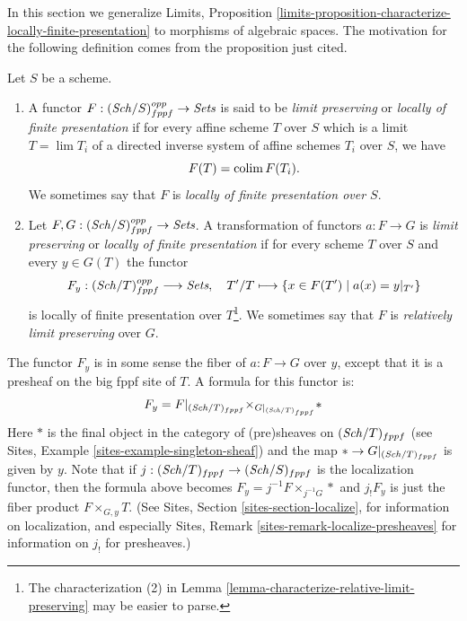 \noindent
In this section we generalize
Limits, Proposition
\ref{limits-proposition-characterize-locally-finite-presentation}
to morphisms of algebraic spaces.
The motivation for the following definition comes from
the proposition just cited.

\begin{definition}
\label{definition-locally-finite-presentation}
Let $S$ be a scheme.
\begin{enumerate}
\item A functor $F : (\mathit{Sch}/S)_{fppf}^{opp} \to \textit{Sets}$
is said to be {\it limit preserving} or {\it locally of finite presentation} if
for every affine scheme $T$ over $S$ which is a limit $T = \lim T_i$
of a directed inverse system of affine schemes $T_i$ over $S$, we have
$$
F(T) = \mathop{\mathrm{colim}}\nolimits F(T_i).
$$
We sometimes say that $F$ is {\it locally of finite presentation over $S$}.
\item Let $F, G : (\mathit{Sch}/S)_{fppf}^{opp} \to \textit{Sets}$.
A transformation of functors $a : F \to G$
is {\it limit preserving} or {\it locally of finite presentation}
if for every scheme $T$ over $S$ and every $y \in G(T)$ the functor
$$
F_y : (\mathit{Sch}/T)_{fppf}^{opp} \longrightarrow \textit{Sets}, \quad
T'/T \longmapsto \{x \in F(T') \mid a(x) = y|_{T'}\}
$$
is locally of finite presentation over $T$\footnote{The characterization (2) in
Lemma \ref{lemma-characterize-relative-limit-preserving}
may be easier to parse.}. We sometimes say that
$F$ is {\it relatively limit preserving} over $G$.
\end{enumerate}
\end{definition}

\noindent
The functor $F_y$ is in some sense the fiber of
$a : F \to G$ over $y$, except that it is a presheaf on the big fppf
site of $T$. A formula for this functor is:
\begin{equation}
\label{equation-fibre-map-functors}
F_y =
F|_{(\mathit{Sch}/T)_{fppf}}
{\times}_{G|_{(\mathit{Sch}/T)_{fppf}}}
*
\end{equation}
Here $*$ is the final object in the category of (pre)sheaves
on $(\mathit{Sch}/T)_{fppf}$ (see
Sites, Example \ref{sites-example-singleton-sheaf})
and the map $* \to G|_{(\mathit{Sch}/T)_{fppf}}$ is given by $y$.
Note that if $j : (\mathit{Sch}/T)_{fppf} \to (\mathit{Sch}/S)_{fppf}$
is the localization functor, then the formula above becomes
$F_y = j^{-1}F \times_{j^{-1}G} *$ and $j_!F_y$ is just the fiber product
$F \times_{G, y} T$. (See
Sites, Section \ref{sites-section-localize},
for information on localization, and especially
Sites, Remark \ref{sites-remark-localize-presheaves}
for information on $j_!$ for presheaves.)

